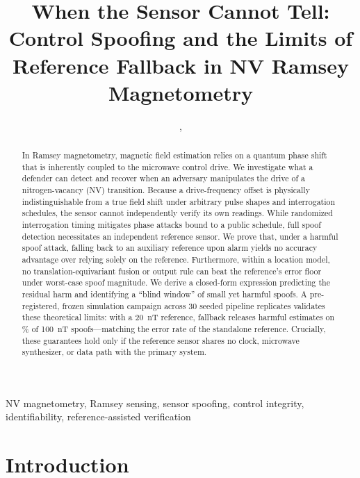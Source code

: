 \documentclass[conference]{IEEEtran}
\title{When the Sensor Cannot Tell: Control Spoofing and the Limits of
Reference Fallback in NV Ramsey Magnetometry}
\author{
    \IEEEauthorblockN{%
         Sounak Bhowmik and
         Himanshu Thapliyal 
                    }
 
    \IEEEauthorblockA{Department of Electrical and Computer Engineering\\
        Southern Methodist University, Dallas, TX, USA}
    \email{sbhowmik@smu.edu},
    \email{hthapliyal@smu.edu}            
}
\begin{document}
\maketitle

\begin{abstract}
In Ramsey magnetometry, magnetic field estimation relies on a quantum phase shift that is inherently coupled to the microwave control drive. We investigate what a defender can detect and recover when an adversary manipulates the drive of a nitrogen-vacancy (NV) transition. Because a drive-frequency offset is physically indistinguishable from a true field shift under arbitrary pulse shapes and interrogation schedules, the sensor cannot independently verify its own readings. While randomized interrogation timing mitigates phase attacks bound to a public schedule, full spoof detection necessitates an independent reference sensor. We prove that, under a harmful spoof attack, falling back to an auxiliary reference upon alarm yields no accuracy advantage over relying solely on the reference. Furthermore, within a location model, no translation-equivariant fusion or output rule can beat the reference's error floor under worst-case spoof magnitude. We derive a closed-form expression predicting the residual harm and identifying a ``blind window'' of small yet harmful spoofs. A pre-registered, frozen simulation campaign across 30 seeded pipeline replicates validates these theoretical limits: with a 20~nT reference, fallback releases harmful estimates on \NominalHarmRate\% of 100~nT spoofs—matching the error rate of the standalone reference. Crucially, these guarantees hold only if the reference sensor shares no clock, microwave synthesizer, or data path with the primary system.
\end{abstract}

\begin{IEEEkeywords}
NV magnetometry, Ramsey sensing, sensor spoofing, control integrity,
identifiability, reference-assisted verification
\end{IEEEkeywords}

\section{Introduction}
\label{sec:intro}
\end{document}
